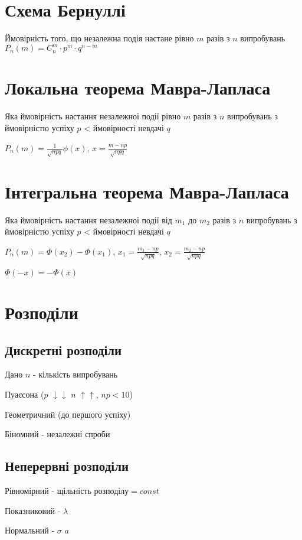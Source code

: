 \documentclass{article}
\begin{document}
\begin{Large}
\section*{Схема Бернуллі}
Ймовірність того, що незалежна подія настане рівно $m$ разів з $n$ випробувань
$P_n(m)=C_n^m\cdot p^m\cdot q^{n-m}$

\section*{Локальна теорема Мавра-Лапласа}
Яка ймовірність настання незалежної події рівно $m$ разів з $n$ випробувань з ймовірністю успіху $p$ < ймовірності невдачі $q$

$P_n(m)=\frac{1}{\sqrt{npq}}\phi(x)$, $x=\frac{m - np}{\sqrt{npq}}$

\section*{Інтегральна теорема Мавра-Лапласа}
Яка ймовірність настання незалежної події від $m_1$ до $m_2$ разів з $n$ випробувань з ймовірністю успіху $p$ < ймовірності невдачі $q$

$P_n(m)=\Phi(x_2)-\Phi(x_1)$, $x_1=\frac{m_1 - np}{\sqrt{npq}}$, $x_2=\frac{m_2 - np}{\sqrt{npq}}$

$\Phi(-x) = -\Phi(x)$

\section*{Розподіли}
\subsection*{Дискретні розподіли}
Дано $n$ - кількість випробувань
\begin{list}{-}{}
	\item Пуассона ($p$ $\downarrow\downarrow$ $n$ $\uparrow\uparrow$, $np < 10$)
	\item Геометричний (до першого успіху)
	\item Біномний - незалежні спроби
\end{list}
\subsection*{Неперервні розподіли}
\begin{list}{-}{}
	\item Рівномірний - $\text{щільність розподілу} = const$
	\item Показниковий - $\lambda$
	\item Нормальний - $\sigma$ $a$
\end{list}
\end{Large}
\end{document}
